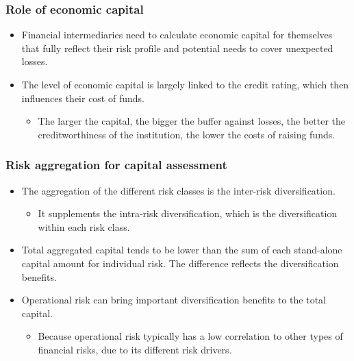 \subsubsection{Role of economic capital }
\begin{itemize}
\item Financial intermediaries need to calculate economic capital for themselves that fully reflect their risk profile and potential needs to cover unexpected losses.
\item The level of economic capital is largely linked to the credit rating, which then influences their cost of funds.
    \begin{itemize}
    \item The larger the capital, the bigger the buffer against losses, the better the creditworthiness of the institution, the lower the costs of raising funds.
    \end{itemize}
    
\end{itemize}


\subsubsection{Risk aggregation for capital assessment}
\begin{itemize}
\item The aggregation of the different risk classes is the inter-risk diversification.
    \begin{itemize}
    \item  It supplements the intra-risk diversification, which is the diversification within each risk class.
    \end{itemize}
\item Total aggregated capital tends to be lower than the sum of each stand-alone capital amount for individual risk. The difference reflects the diversification benefits.
\item Operational risk can bring important diversification benefits to the total capital.
    \begin{itemize}
    \item Because operational risk typically has a low correlation to other types of financial risks, due to its different risk drivers.
    \end{itemize}
\end{itemize}



